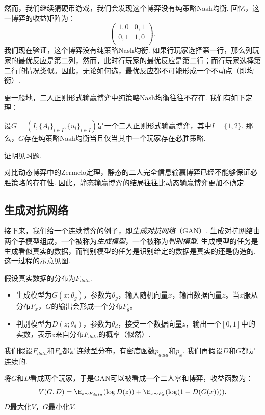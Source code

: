 然而，我们继续猜硬币游戏，我们会发现这个博弈没有纯策略Nash均衡. 回忆，这一博弈的收益矩阵为：
    \[
    \begin{pmatrix}
    1,0&0,1\\
    0,1&1,0\\
    \end{pmatrix}.
    \]
我们现在验证，这个博弈没有纯策略Nash均衡. 如果行玩家选择第一行，那么列玩家的最优反应是第二列，然而，此时行玩家的最优反应是第二行；而行玩家选择第二行的情况类似。因此，无论如何选，最优反应都不可能形成一个不动点（即均衡）.

更一般地，二人正则形式输赢博弈中纯策略Nash均衡往往不存在. 我们有如下定理：
\begin{theorem}
设$G=(I,\{A_i\}_{i\in I}, \{u_i\}_{i\in I})$是一个二人正则形式输赢博弈，其中$I=\{1,2\}$. 那么，$G$存在纯策略Nash均衡当且仅当其中一个玩家存在必胜策略. %
\end{theorem}
证明见习题.

对比动态博弈中的Zermelo定理，静态的二人完全信息输赢博弈已经不能够保证必胜策略的存在性. 因此，静态输赢博弈的结局往往比动态输赢博弈更加不确定.


\subsection{生成对抗网络}

接下来，我们给一个连续博弈的例子，即\emph{生成对抗网络}（GAN）. 生成对抗网络由两个子模型组成，一个被称为\emph{生成模型}，一个被称为\emph{判别模型}. 生成模型的任务是生成看似真实的数据，而判别模型的任务是识别给定的数据是真实的还是伪造的. 这一过程的示意见图.

假设真实数据的分布为$F_{data}$. 
\begin{itemize}
    \item 生成模型为$G(x;\theta_g)$，参数为$\theta_g$，输入随机向量$x$，输出数据向量$z$。当$x$服从分布$F_x$，$G$的输出会形成一个分布$F_g$。
    \item 判别模型为$D(z;\theta_d)$，参数为$\theta_d$，接受一个数据向量$z$，输出一个$[0,1]$中的实数，表示$z$来自分布$F_{data}$的概率（似然）.
\end{itemize}
我们假设$F_{data}$和$F_x$都是连续型分布，有密度函数$p_{data}$和$p_x$. 我们再假设$D$和$G$都是连续的.

将$G$和$D$看成两个玩家，于是GAN可以被看成一个二人零和博弈，收益函数为：
    \[
        V(G,D)=\E_{z\sim F_{data}}(\log D(z))+\E_{x\sim F_x}(\log(1-D(G(x)))).
    \]
$D$最大化$V$，$G$最小化$V$.

